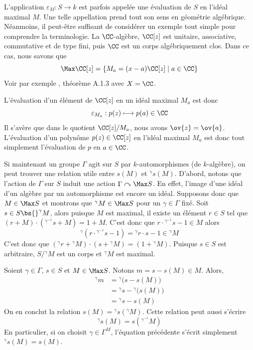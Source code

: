 \begin{Rem} L'application $\varepsilon_M : S \rightarrow k$ est parfois appelée une évaluation de $S$ en l'idéal maximal $M$. Une telle appellation prend tout son sens en géométrie algébrique. Néanmoins, il peut-être suffisant de considérer un exemple tout simple pour comprendre la terminologie. La \linebreak $\CC$-algèbre, $\CC[z]$ est unitaire, associative, commutative et de type fini, puis $\CC$ est un corps algébriquement clos. Dans ce cas, nous savons que 
$$ \Max \CC[z] = \{M_a = (x-a)\CC[z] \; | \; a \in \CC\} $$
Voir par exemple \cite{GWsym}, théorème A.1.3 avec $X = \CC$.

L'évaluation d'un élément de $\CC[z]$ en un idéal maximal $M_a$ est donc
$$ \varepsilon_{M_a} : p(z) \longmapsto p(a) \in \CC $$
Il s'avère que dans le quotient $\CC[z]/M_a$, nous avons $\ov{z} = \ov{a}$. L'évaluation d'un polynôme \linebreak $p(z) \in \CC[z]$ en l'idéal maximal $M_a$ est donc tout simplement l'évaluation de $p$ en $a \in \CC$. 
\end{Rem}

Si maintenant un groupe $\Gamma$ agit sur $S$ par $k$-automorphismes (de $k$-algèbre), on peut trouver une relation utile entre $s(M)$ et ${}^\gamma s(M)$. D'abord, notons que l'action de $\Gamma$ sur $S$ induit une action $\Gamma \curvearrowright \Max S$. En effet, l'image d'une idéal d'un algèbre par un automorphisme est encore un idéal. Supposons donc que $M \in \Max S$ et montrons que ${}^\gamma M \in \Max S$ pour un $\gamma \in \Gamma$ fixé. Soit $s \in S \bs {}^\gamma M$, alors puisque $M$ est maximal, il existe un élément $r \in S$ tel que $(r + M) \cdot({}^{\gamma^{-1}} s + M) = 1 + M$. C'est donc que $r \cdot {}^{\gamma^{-1}}s - 1 \in M$ alors
$$ {}^\gamma (r \cdot {}^{\gamma^{-1}}s - 1) = {}^\gamma r \cdot s - 1 \in  {}^\gamma M $$
C'est donc que $({}^\gamma r + {}^\gamma M) \cdot ( s + {}^\gamma M) = (1 + {}^\gamma M)$. Puisque $s \in S$ est arbitraire, $S/{}^\gamma M$ est un corps et ${}^\gamma M$ est maximal.

Soient $\gamma \in \Gamma$, $s \in S$ et $M \in \Max S$. Notons $m = s-s(M) \in M$. Alors,
\begin{align*} 
{}^\gamma m &=  {}^\gamma \big(s-s(M)\big) \\
&= {}^\gamma s - {}^\gamma \big(s(M)\big) \\
&= {}^\gamma s - s(M)
\end{align*}
On en conclut la relation $s(M) = {}^\gamma s( {}^\gamma M)$. Cette relation peut aussi s'écrire
\begin{equation}
{}^\gamma s(M) = s({}^{\gamma^{-1}} M) 
\end{equation}
En particulier, si on choisit $\gamma \in \Gamma^M$, l'équation précédente s'écrit simplement ${}^\gamma s(M) = s(M)$.

